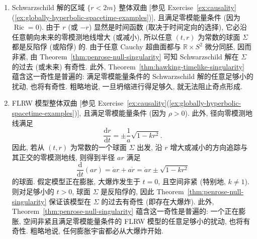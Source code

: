 \begin{RiemannExample}\label{ex:penrose-singularities-in-schwarzschild-and-flrw}
\begin{enumerate}[label=(\arabic*),ref=\arabic*,leftmargin=*]
\item Schwarzschild 解的区域 $\{r<2m\}$ 整体双曲 [参见 Exercise~\ref{ex:causality}(\ref{ex:globally-hyperbolic-spacetime-examples})], 且满足零模能量条件 (因为 $\operatorname{Ric}=0$). 由于 $r$ (或 $-r$) 显然是时间函数 (取决于时间定向的选择), 它必沿任意朝向未来的零模测地线增大 (或减小), 所以任意 $(t,r)$ 为常数的球面 $\Sigma$ 都是反陷俘 (或陷俘) 的. 由于任意 Cauchy 超曲面都与 $\mathbb{R}\times S^2$ 微分同胚, 因而非紧, 由 Theorem~\ref{thm:penrose-null-singularity} 可知 Schwarzschild 解在 $\Sigma$ 的过去 (或未来) 有奇性. 此外, Theorem~\ref{thm:hawking-timelike-singularity} 蕴含这一奇性是普遍的: 满足零模能量条件的 Schwarzschild 解的任意足够小的扰动, 也将有奇性. 粗略地说, 一旦坍缩进行得足够久, 就无法阻止奇点形成.
\item FLRW 模型整体双曲 [参见 Exercise~\ref{ex:causality}(\ref{ex:globally-hyperbolic-spacetime-examples})], 且满足零模能量条件 (因为 $\rho>0$). 此外, 径向零模测地线满足
\[
  \frac{\mathrm{d}r}{\mathrm{d}t}=\pm\frac{1}{a}\sqrt{1-kr^2}.
\]
因此, 若从 $(t,r)$ 为常数的一个球面 $\Sigma$ 出发, 沿 $r$ 增大或减小的方向追踪与其正交的零模测地线, 则得到半径 $ar$ 满足
\[
  \frac{\mathrm{d}}{\mathrm{d}t}(ar)=\dot a r+a\dot r=\dot a r\pm\sqrt{1-kr^2}
\]
的球面. 假定模型正在膨胀, 大爆炸发生于 $t=0$, 且空间非紧 (特别地, $k\ne1$). 则对足够小的 $t>0$, 球面 $\Sigma$ 是反陷俘的, 因此 Theorem~\ref{thm:penrose-null-singularity} 保证该模型在 $\Sigma$ 的过去有奇性 (即存在大爆炸). 此外, Theorem~\ref{thm:penrose-null-singularity} 蕴含这一奇性是普遍的: 一个正在膨胀, 空间非紧且满足零模能量条件的 FLRW 模型的任意足够小的扰动, 也将有奇性. 粗略地说, 任何膨胀宇宙都必从大爆炸开始.
\end{enumerate}
\end{RiemannExample}

